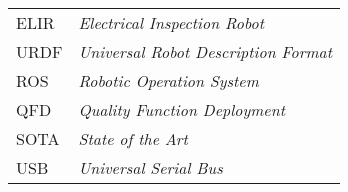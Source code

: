 \begin{thesisabbreviations}
\begin{footnotesize}
\begin{longtable}[l]{p{2cm}l}
 
  ELIR      \dotfill &  \textit{Electrical Inspection Robot} \\
  URDF      \dotfill &  \textit{Universal Robot Description Format} \\
  ROS       \dotfill &  \textit{Robotic Operation System} \\
  QFD       \dotfill &  \textit{Quality Function Deployment} \\
  SOTA      \dotfill &  \textit{State of the Art} \\
  USB		\dotfill &  \textit{Universal Serial Bus} \\
\end{longtable}
\end{footnotesize}
\end{thesisabbreviations}
